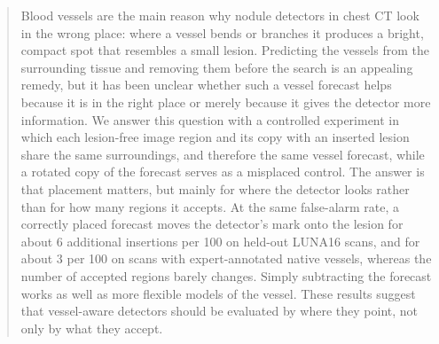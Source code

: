 \begin{abstract}
Blood vessels are the main reason why nodule detectors in chest CT look in the wrong place: where a vessel bends or branches it produces a bright, compact spot that resembles a small lesion. Predicting the vessels from the surrounding tissue and removing them before the search is an appealing remedy, but it has been unclear whether such a vessel forecast helps because it is in the right place or merely because it gives the detector more information. We answer this question with a controlled experiment in which each lesion-free image region and its copy with an inserted lesion share the same surroundings, and therefore the same vessel forecast, while a rotated copy of the forecast serves as a misplaced control. The answer is that placement matters, but mainly for where the detector looks rather than for how many regions it accepts. At the same false-alarm rate, a correctly placed forecast moves the detector's mark onto the lesion for about 6 additional insertions per 100 on held-out LUNA16 scans, and for about 3 per 100 on scans with expert-annotated native vessels, whereas the number of accepted regions barely changes. Simply subtracting the forecast works as well as more flexible models of the vessel. These results suggest that vessel-aware detectors should be evaluated by where they point, not only by what they accept.
\end{abstract}
